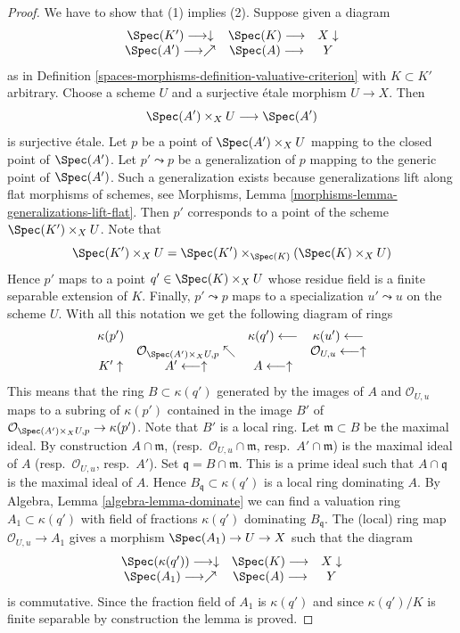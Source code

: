 \begin{proof}
We have to show that (1) implies (2). Suppose given a diagram
$$
\begin{array}{ccc}\Spec(K') \longrightarrow\downarrow & \Spec(K) \longrightarrow & X \downarrow \\ \Spec(A') \longrightarrow\nearrow & \Spec(A) \longrightarrow & Y\end{array}
$$
as in Definition \ref{spaces-morphisms-definition-valuative-criterion} with $K \subset K'$
arbitrary. Choose a scheme $U$ and a surjective \'etale morphism $U \to X$.
Then
$$
\Spec(A') \times_X U \longrightarrow \Spec(A')
$$
is surjective \'etale. Let $p$ be a point of $\Spec(A') \times_X U$
mapping to the closed point of $\Spec(A')$. Let $p' \leadsto p$
be a generalization of $p$ mapping to the generic point of $\Spec(A')$.
Such a generalization exists because generalizations lift along flat
morphisms of schemes, see
Morphisms, Lemma \ref{morphisms-lemma-generalizations-lift-flat}.
Then $p'$ corresponds to a point of the scheme $\Spec(K') \times_X U$.
Note that
$$
\Spec(K') \times_X U
=
\Spec(K') \times_{\Spec(K)} (\Spec(K) \times_X U)
$$
Hence $p'$ maps to a point $q' \in \Spec(K) \times_X U$ whose
residue field is a finite separable extension of $K$. Finally,
$p' \leadsto p$ maps to a specialization $u' \leadsto u$ on the
scheme $U$. With all this notation we get the following diagram of
rings
$$
\begin{array}{cccc}\kappa(p') &  & \kappa(q') \longleftarrow & \kappa(u') \longleftarrow \\  & \mathcal{O}_{\Spec(A') \times_X U, p} \nwarrow &  & \mathcal{O}_{U, u} \longleftarrow\uparrow \\ K' \uparrow & A' \longleftarrow\uparrow & A \longleftarrow\uparrow & \end{array}
$$
This means that the ring $B \subset \kappa(q')$ generated by
the images of $A$ and $\mathcal{O}_{U, u}$ maps to a subring
of $\kappa(p')$ contained in the image $B'$ of
$\mathcal{O}_{\Spec(A') \times_X U, p} \to \kappa(p')$.
Note that $B'$ is a local ring. Let $\mathfrak m \subset B$
be the maximal ideal. By construction $A \cap \mathfrak m$,
(resp.\ $\mathcal{O}_{U, u} \cap \mathfrak m$, resp.\ $A' \cap \mathfrak m$)
is the maximal ideal of $A$ (resp.\ $\mathcal{O}_{U, u}$, resp.\ $A'$).
Set $\mathfrak q = B \cap \mathfrak m$. This is a
prime ideal such that $A \cap \mathfrak q$ is the maximal ideal of $A$.
Hence $B_{\mathfrak q} \subset \kappa(q')$ is a local ring dominating
$A$. By
Algebra, Lemma \ref{algebra-lemma-dominate}
we can find a valuation ring $A_1 \subset \kappa(q')$
with field of fractions $\kappa(q')$
dominating $B_{\mathfrak q}$. The (local) ring map
$\mathcal{O}_{U, u} \to A_1$ gives a morphism
$\Spec(A_1) \to U \to X$
such that the diagram
$$
\begin{array}{ccc}\Spec(\kappa(q')) \longrightarrow\downarrow & \Spec(K) \longrightarrow & X \downarrow \\ \Spec(A_1) \longrightarrow\nearrow & \Spec(A) \longrightarrow & Y\end{array}
$$
is commutative. Since the fraction field of $A_1$ is $\kappa(q')$
and since $\kappa(q')/K$ is finite
separable by construction the lemma is proved.
\end{proof}

